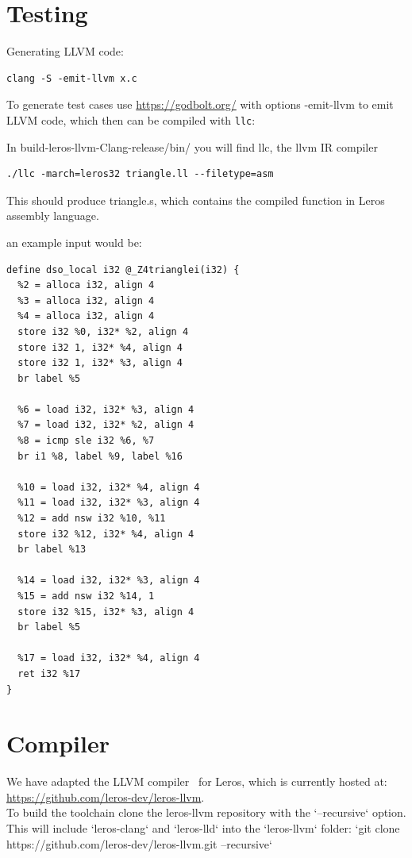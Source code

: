 \documentclass[a4paper,fontsize=10pt,twoside,DIV15,BCOR12mm,headinclude=true,footinclude=false,pagesize,bibtotoc]{scrbook}
\newcommand{\code}[1]{{\small{\texttt{#1}}}}
\begin{document}
\chapter{Testing}

Generating LLVM code:

\begin{verbatim}
clang -S -emit-llvm x.c
\end{verbatim}

To generate test cases use \url{https://godbolt.org/} with options -emit-llvm to emit LLVM code,
which then can be compiled with \code{llc}:

In build-leros-llvm-Clang-release/bin/ you will find llc, the llvm IR compiler

\begin{verbatim}
./llc -march=leros32 triangle.ll --filetype=asm
\end{verbatim}
This should produce triangle.s, which contains the compiled function in Leros assembly language. 

an example input would be:

\begin{verbatim}
define dso_local i32 @_Z4trianglei(i32) {
  %2 = alloca i32, align 4
  %3 = alloca i32, align 4
  %4 = alloca i32, align 4
  store i32 %0, i32* %2, align 4
  store i32 1, i32* %4, align 4
  store i32 1, i32* %3, align 4
  br label %5

  %6 = load i32, i32* %3, align 4
  %7 = load i32, i32* %2, align 4
  %8 = icmp sle i32 %6, %7
  br i1 %8, label %9, label %16

  %10 = load i32, i32* %4, align 4
  %11 = load i32, i32* %3, align 4
  %12 = add nsw i32 %10, %11
  store i32 %12, i32* %4, align 4
  br label %13

  %14 = load i32, i32* %3, align 4
  %15 = add nsw i32 %14, 1
  store i32 %15, i32* %3, align 4
  br label %5

  %17 = load i32, i32* %4, align 4
  ret i32 %17
}
\end{verbatim}

\chapter{Compiler}

We have adapted the LLVM compiler~\cite{llvm:2004} for Leros, which is currently hosted at:
\url{https://github.com/leros-dev/leros-llvm}.\\
To build the toolchain clone the leros-llvm repository with the `--recursive` option. This will include `leros-clang` and `leros-lld` into the `leros-llvm` folder:    
`git clone https://github.com/leros-dev/leros-llvm.git --recursive`
\end{document}
